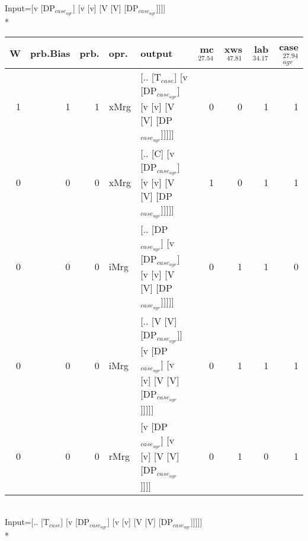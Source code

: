 \begingroup\scriptsize Input=[v [DP$_{case_{agr}}$] [v [v] [V [V] [DP$_{case_{agr}}$]]]]\\*
\begin{tabularx}{\linewidth}{rrrlXrrrr}
\hline
   W &   prb.Bias &   prb. & opr.   & output                                                                     &   mc$^{27.54}$ &   xws$^{47.81}$ &   lab$^{34.17}$ &   case$_{agr}^{27.94}$ \\
\hline
   1 &       1 &   1 & xMrg & [.. [T$_{case}$] [v [DP$_{case_{agr}}$] [v [v] [V [V] [DP$_{case_{agr}}$]]]]]              &            0 &             0 &             1 &                  1 \\
   0 &       0 &   0 & xMrg & [.. [C] [v [DP$_{case_{agr}}$] [v [v] [V [V] [DP$_{case_{agr}}$]]]]]                   &            1 &             0 &             1 &                  1 \\
   0 &       0 &   0 & iMrg & [.. [DP$_{case_{agr}}$] [v [DP$_{case_{agr}}$] [v [v] [V [V] [DP$_{case_{agr}}$]]]]]         &            0 &             1 &             1 &                  0 \\
   0 &       0 &   0 & iMrg & [.. [V [V] [DP$_{case_{agr}}$]] [v [DP$_{case_{agr}}$] [v [v] [V [V] [DP$_{case_{agr}}$]]]]] &            0 &             1 &             1 &                  1 \\
   0 &       0 &   0 & rMrg & [v [DP$_{case_{agr}}$] [v [v] [V [V] [DP$_{case_{agr}}$]]]]                            &            0 &             1 &             0 &                  1 \\
\hline
\end{tabularx}\endgroup\\
\begingroup\scriptsize Input=[.. [T$_{case}$] [v [DP$_{case_{agr}}$] [v [v] [V [V] [DP$_{case_{agr}}$]]]]]\\*
